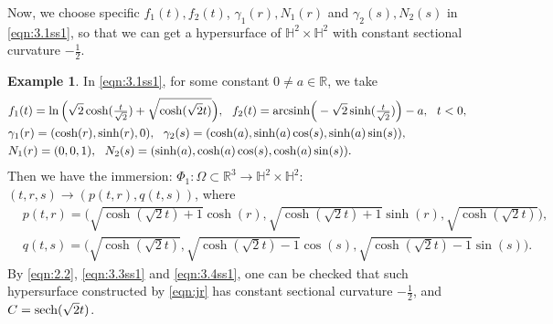 \documentclass[reqno]{amsart}%
\newtheorem{lemma}[theorem]{Lemma}
\theoremstyle{definition}
\newtheorem{example}[theorem]{Example}
\numberwithin{equation}{section}
\begin{document}
Now, we choose specific $f_1(t),f_2(t)$, $\gamma_1(r),N_1(r)$ and $\gamma_2(s),N_2(s)$ in \eqref{eqn:3.1ss1}, so that we can get a hypersurface of $\mathbb{H}^2\times \mathbb{H}^2$ with constant sectional curvature $-\frac{1}{2}$.

\begin{example}\label{exam:4.1ss1ss11ab1}
In \eqref{eqn:3.1ss1}, for some constant $0\neq a\in \mathbb{R}$, we take
$$
\begin{aligned}
&f_1(t)=\ln\Big(\sqrt{2}\cosh(\tfrac{t}{\sqrt{2}})+\sqrt{\cosh(\sqrt{2}t)}\Big),\ \
f_2(t)={\rm arcsinh}\Big(-\sqrt{2}\sinh(\tfrac{t}{\sqrt{2}})\Big)-a,\ \ t<0,\\
&\gamma_1(r)=(\cosh(r),\sinh(r),0), \ \
\gamma_2(s)=(\cosh(a),\sinh(a)\cos(s),\sinh(a)\sin(s)),\\
&N_1(r)=(0,0,1),\ \ N_2(s)=(\sinh(a),\cosh(a)\cos(s),\cosh(a)\sin(s)).
\end{aligned}	
$$
Then we have the immersion:
$\Phi_1:\Omega\subset\mathbb{R}^3\rightarrow\mathbb{H}^2\times\mathbb{H}^2$:
$(t,r,s)\rightarrow(p(t,r),q(t,s))$, where %
%
\begin{equation}\label{eqn:jr}
\begin{aligned}
&p(t,r)=\Big(\sqrt{\cosh(\sqrt{2}t)+1}\cosh(r),\sqrt{\cosh(\sqrt{2}t)+1}\sinh(r),\sqrt{\cosh(\sqrt{2}t)}\Big),\\
&q(t,s)=\Big(\sqrt{\cosh(\sqrt{2}t)},\sqrt{\cosh(\sqrt{2}t)-1}\cos(s),\sqrt{\cosh(\sqrt{2}t)-1}\sin(s)\Big).
\end{aligned}	
\end{equation}
By \eqref{eqn:2.2}, \eqref{eqn:3.3ss1} and \eqref{eqn:3.4ss1}, one can be checked that such hypersurface constructed by \eqref{eqn:jr} has constant sectional curvature $-\frac{1}{2}$, and
$C={\rm sech}(\sqrt{2}t)$.
\end{example}








%
\end{document}
